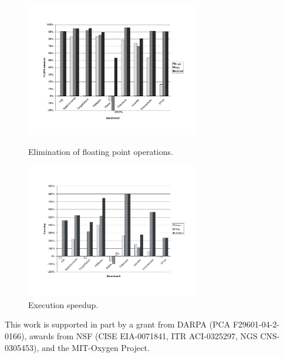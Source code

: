 \documentclass{csailabstractbook}
\begin{document}
\begin{figure}[t]
\begin{center}
    \hfill
    \begin{minipage}{3in}
    \includegraphics[width=3in]{thies3-4.pdf} %
    \vspace{-18.5pt}
    \caption{Elimination of floating point operations.\protect\label{fig:thies3-flops}}
    \end{minipage}
    \hfill
    \begin{minipage}{3in}
    \includegraphics[width=3in]{thies3-3.pdf} %
    \vspace{-16pt}
    \caption{Execution speedup.\protect\label{fig:thies3-speedup}}
    \end{minipage}
    \hfill
  \end{center}
  \vspace{-20pt}
\end{figure}

This work is supported in part by a grant from DARPA (PCA
F29601-04-2-0166), awards from NSF (CISE EIA-0071841, ITR ACI-0325297,
NGS CNS-0305453), and the MIT-Oxygen Project.


\end{document}
